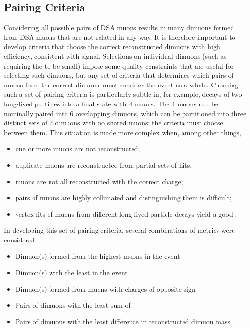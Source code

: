\subsection{Pairing Criteria}
\label{sec:dd:PC}
Considering all possible pairs of DSA muons results in many dimuons formed from DSA muons that are not related in any way.
It is therefore important to develop criteria that choose the correct reconstructed dimuons with high efficiency, consistent with signal.
Selections on individual dimuons (such as requiring the \vchisq to be small) impose some quality constraints that are useful for selecting such dimuons, but any set of criteria that determines which pairs of muons form the correct dimuons must consider the event as a whole.
Choosing such a set of pairing criteria is particularly subtle in, for example, decays of two long-lived particles into a final state with 4 muons.
The 4 muons can be nominally paired into 6 overlapping dimuons, which can be partitioned into three distinct sets of 2 dimuons with no shared muons; the criteria must choose between them.
This situation is made more complex when, among other things,
\begin{itemize}
  \setlength\itemsep{.2\baselineskip}
  \item one or more muons are not reconstructed;
  \item duplicate muons are reconstructed from partial sets of hits;
  \item muons are not all reconstructed with the correct charge;
  \item pairs of muons are highly collimated and distinguishing them is difficult;
  \item vertex fits of muons from different long-lived particle decays yield a good \vchisq.
\end{itemize}
In developing this set of pairing criteria, several combinations of metrics were considered.
\begin{itemize}
  \setlength\itemsep{.2\baselineskip}
  \item Dimuon(s) formed from the highest \pT muons in the event
  \item Dimuon(s) with the least \vchisq in the event
  \item Dimuon(s) formed from muons with charges of opposite sign
  \item Pairs of dimuons with the least sum of \vchisq
  \item Pairs of dimuons with the least difference in reconstructed dimuon mass
\end{itemize}
